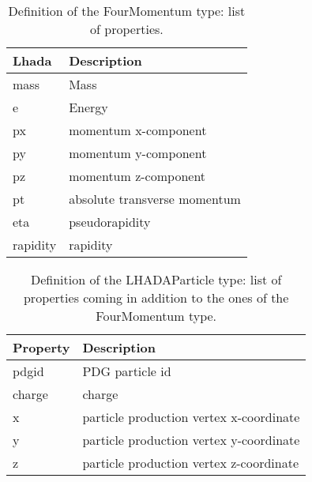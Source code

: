 \documentclass[11pt]{cernrep}
\begin{document}
\begin{table}
  \center
  \caption{Definition of the FourMomentum type: list of properties.\label{tab:mom}}
  \begin{tabular}{l|l}
    {\sc Lhada} & Description \\
    \hline
    mass 	& Mass\\
    e 	        & Energy\\
    px 	        & momentum x-component\\
    py 	        & momentum y-component\\
    pz 	        & momentum z-component\\
    pt 	        & absolute transverse momentum\\
    eta         & pseudorapidity\\
    rapidity    & rapidity\\
  \end{tabular}
\end{table}

\begin{table}
  \center
  \caption{Definition of the LHADAParticle type: list of properties coming in addition to the ones of the FourMomentum type.\label{tab:part}}
  \begin{tabular}{l|l}
    Property    & Description \\
    \hline
    pdgid       & PDG particle id\\
    charge      & charge\\
    x           & particle production vertex x-coordinate\\
    y           & particle production vertex y-coordinate\\
    z           & particle production vertex z-coordinate  \\
  \end{tabular}
\end{table}
\end{document}
